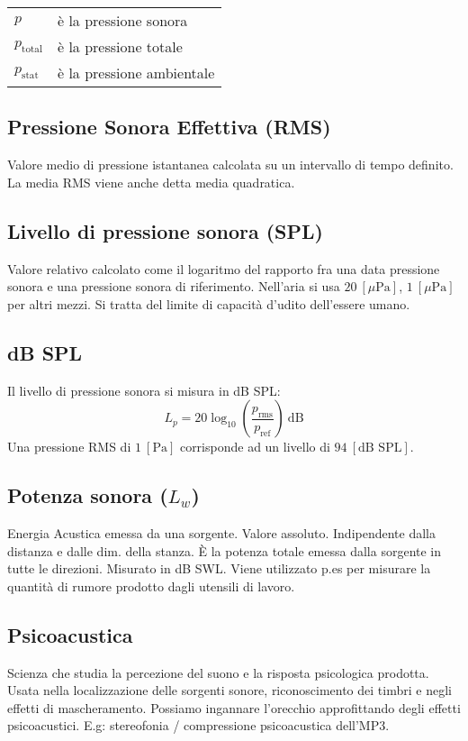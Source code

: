 \documentclass[8pt,a4paper]{article}
\begin{document}
\begin{multicols}{5}
    \begin{tabular}{ll}
      $p$ & è la pressione sonora \\
      $p_{\text{total}}$ & è la pressione totale \\
      $p_{\text{stat}}$ & è la pressione ambientale
    \end{tabular}

    \subsection{Pressione Sonora Effettiva (RMS)}
    Valore medio di pressione istantanea calcolata su un intervallo di tempo
    definito. La media RMS viene anche detta media quadratica.
    
    \subsection{Livello di pressione sonora (SPL)}
    Valore relativo calcolato come il logaritmo del rapporto fra una data pressione
    sonora e una pressione sonora di riferimento. Nell'aria si usa $20\ [\mu \text{Pa}]$,
    $1\ [\mu \text{Pa}]$ per altri mezzi. Si tratta del limite di capacità d'udito 
    dell'essere umano.

    \subsection{dB SPL}
    Il livello di pressione sonora si misura in dB SPL:
    \begin{equation*}
      L_p = 20 \log_{10} (\frac{p_\text{rms}}{p_\text{ref}})\ \text{dB}
    \end{equation*}
    Una pressione RMS di $1\ [\text{Pa}]$ corrisponde ad un livello di $94
    \ [\text{dB SPL}]$.
    \subsection{Potenza sonora ($L_w$)}
    Energia Acustica emessa da una sorgente. Valore assoluto. Indipendente dalla
    distanza e dalle dim. della stanza. È la potenza totale emessa dalla sorgente
    in tutte le direzioni. Misurato in dB SWL. Viene utilizzato p.es per misurare
    la quantità di rumore prodotto dagli utensili di lavoro.

    \subsection{Psicoacustica}
    Scienza che studia la percezione del suono e la risposta psicologica prodotta.
    Usata nella localizzazione delle sorgenti sonore, riconoscimento dei timbri e
    negli effetti di mascheramento. Possiamo ingannare l'orecchio approfittando degli
    effetti psicoacustici. E.g: stereofonia / compressione psicoacustica dell'MP3.


\end{multicols}
\end{document}
